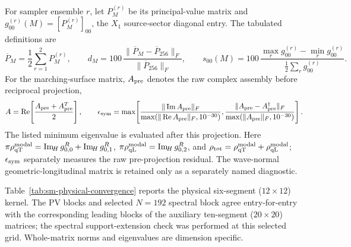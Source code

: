 \documentclass[10pt,aps,onecolumn,notitlepage,nofootinbib]{revtex4-2}
\newcommand{\qT}{\mathrm{qT}}
\newcommand{\qL}{\mathrm{qL}}
\newcommand{\ImH}{\operatorname{Im}_{\!H}}
\begin{document}
For sampler ensemble $r$, let $P_M^{(r)}$ be its principal-value matrix and $g_{00}^{(r)}(M)=[P_M^{(r)}]_{00}$, the $X_1$ source-sector diagonal entry. The tabulated definitions are
\begin{equation}
 \overline P_M=\frac12\sum_{r=1}^{2}P_M^{(r)},\qquad
 d_M=100\,\frac{\|\overline P_M-\overline P_{256}\|_F}{\|\overline P_{256}\|_F},\qquad
 s_{00}(M)=100\,\frac{\max_r g_{00}^{(r)}-\min_r g_{00}^{(r)}}{\frac12\sum_r g_{00}^{(r)}} .
\end{equation}
For the marching-surface matrix, $A_{\rm pre}$ denotes the raw complex assembly before reciprocal projection,
\begin{equation}
 A=\operatorname{Re}\!\left[\frac{A_{\rm pre}+A_{\rm pre}^{T}}2\right],\qquad
 \epsilon_{\rm sym}=\max\!\left[
 \frac{\|\operatorname{Im}A_{\rm pre}\|_F}{\max(\|\operatorname{Re}A_{\rm pre}\|_F,10^{-30})},
 \frac{\|A_{\rm pre}-A_{\rm pre}^{\dagger}\|_F}{\max(\|A_{\rm pre}\|_F,10^{-30})}
 \right].
\end{equation}
The listed minimum eigenvalue is evaluated after this projection. Here $\pi\rho_{\qT}^{\rm modal}=\ImH g_{0,0}^R+\ImH g_{0,1}^R$, $\pi\rho_{\qL}^{\rm modal}=\ImH g_{0,2}^R$, and $\rho_{\rm tot}=\rho_{\qT}^{\rm modal}+\rho_{\qL}^{\rm modal}$; $\epsilon_{\rm sym}$ separately measures the raw pre-projection residual. The wave-normal geometric-longitudinal matrix is retained only as a separately named diagnostic.

Table~\ref{tab:sm-physical-convergence} reports the physical six-segment ($12\times12$) kernel. The PV blocks and selected $N=192$ spectral block agree entry-for-entry with the corresponding leading blocks of the auxiliary ten-segment ($20\times20$) matrices; the spectral support-extension check was performed at this selected grid. Whole-matrix norms and eigenvalues are dimension specific.
\end{document}
